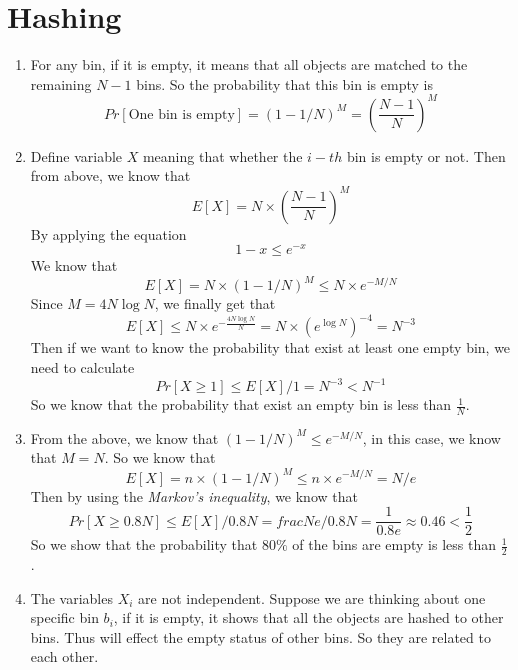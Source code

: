 \documentclass{article}
\begin{document}
	\section{Hashing}
		\begin{enumerate}
			\item For any bin, if it is empty, it means that all objects are matched to the remaining $N -1 $ bins. So the probability that this bin is empty is \begin{equation}
				Pr\left[ \text{One bin is empty}\right] = (1 - 1/N)^M = (\frac{N - 1}{N})^M
			\end{equation}
			\item Define variable $X$ meaning that whether the $i-th$ bin is empty or not. Then from above, we know that \begin{equation}
				E\left[X \right] = N \times (\frac{N - 1}{N})^M
			\end{equation}
			By applying the equation \begin{equation}
				1 - x \leq e^{-x}
			\end{equation}
			We know that \begin{equation}
				E\left[X\right] = N \times (1 - 1/N)^M \leq N \times e^{-M/N}
			\end{equation}
			Since $M = 4N \log{N}$, we finally get that \begin{equation}
				E\left[X\right] \leq N \times e^{-\frac{4N \log{N}}{N}} = N \times (e^{\log{N}})^{-4} = N^{-3}
			\end{equation}
			Then if we want to know the probability that exist at least one empty bin, we need to calculate \begin{equation}
				Pr\left[X \geq 1\right] \leq E\left[X\right] / 1 = N^{-3} < N^{-1}
			\end{equation}
			So we know that the probability that exist an empty bin is less than $\frac{1}{N}$.
			\item From the above, we know that $(1 - 1/N)^M \leq e^{-M/N}$, in this case, we know that $M =  N$. So we know that \begin{equation}
				E\left[X\right] = n\times(1 - 1/N)^M \leq n\times e^{-M/N} = N/e
			\end{equation}
			Then by using the \emph{Markov's inequality}, we know that \begin{equation}
				Pr\left[X \geq 0.8N\right] \leq E\left[X\right] / 0.8N = frac{N}{e} / 0.8N = \frac{1}{0.8e} \approx 0.46 < \frac{1}{2}
			\end{equation}
			So we show that the probability that $80\%$ of the bins are empty is less than $\frac{1}{2}$.
			\item The variables $X_i$ are not independent. Suppose we are thinking about one specific bin $b_i$, if it is empty, it shows that all the objects are hashed to other bins. Thus will effect the empty status of other bins. So they are related to each other.
		\end{enumerate}
\end{document}
